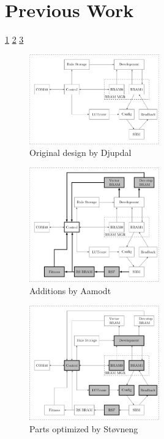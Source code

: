 \documentclass[a4paper]{IEEEtran}
\begin{document}
\section{Previous Work}

\ref{fig:ca-djupdal}
\ref{fig:ca-aamodt}
\ref{fig:ca-stovneng}

\cite{djupdal2003sblock}
\cite{aamodt2005sblock}
\cite{stovneng2014sblock}

\begin{figure}[h!]
    \centering
    \includegraphics[width=0.5\textwidth]{figures/ca-djupdal}
    \caption{Original design by Djupdal}
    \label{fig:ca-djupdal}
\end{figure}

\begin{figure}[h!]
    \centering
    \includegraphics[width=0.5\textwidth]{figures/ca-aamodt}
    \caption{Additions by Aamodt}
    \label{fig:ca-aamodt}
\end{figure}

\begin{figure}[h!]
    \centering
    \includegraphics[width=0.5\textwidth]{figures/ca-stovneng}
    \caption{Parts optimized by Støvneng}
    \label{fig:ca-stovneng}
\end{figure}
\end{document}
